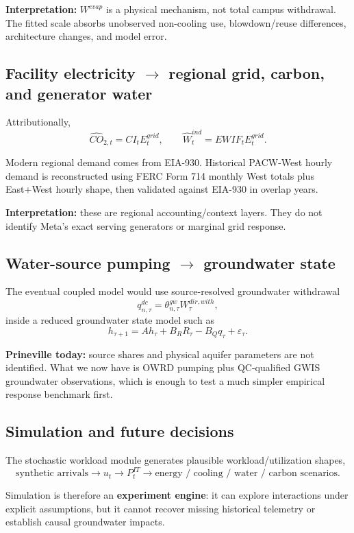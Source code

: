 \documentclass[11pt]{article}
\begin{document}
\textbf{Interpretation:} \(W^{evap}\) is a physical mechanism, not total campus withdrawal. The fitted scale absorbs unobserved non-cooling use, blowdown/reuse differences, architecture changes, and model error.

\subsection{Facility electricity \(\rightarrow\) regional grid, carbon, and generator water}

Attributionally,
\[
\widehat{CO}_{2,t}=CI_tE^{grid}_t,
\qquad
\widehat W^{ind}_t=EWIF_tE^{grid}_t.
\]

Modern regional demand comes from EIA-930. Historical PACW-West hourly demand is reconstructed using FERC Form 714 monthly West totals plus East+West hourly shape, then validated against EIA-930 in overlap years.

\textbf{Interpretation:} these are regional accounting/context layers. They do not identify Meta's exact serving generators or marginal grid response.

\subsection{Water-source pumping \(\rightarrow\) groundwater state}

The eventual coupled model would use source-resolved groundwater withdrawal
\[
q^{dc}_{n,\tau}
=
\theta^{gw}_{n,\tau}W^{dir,with}_{\tau},
\]
inside a reduced groundwater state model such as
\[
h_{\tau+1}
=
Ah_\tau+B_RR_\tau-B_Qq_\tau+\varepsilon_\tau.
\]

\textbf{Prineville today:} source shares and physical aquifer parameters are not identified. What we now have is OWRD pumping plus QC-qualified GWIS groundwater observations, which is enough to test a much simpler empirical response benchmark first.

\subsection{Simulation and future decisions}

The stochastic workload module generates plausible workload/utilization shapes,
\[
\text{synthetic arrivals}
\rightarrow
u_t
\rightarrow
P^{IT}_t
\rightarrow
\text{energy / cooling / water / carbon scenarios}.
\]

Simulation is therefore an \textbf{experiment engine}: it can explore interactions under explicit assumptions, but it cannot recover missing historical telemetry or establish causal groundwater impacts.
\end{document}
